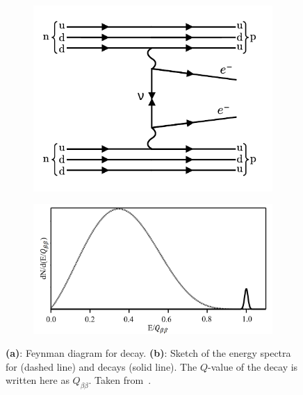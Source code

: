 \begin{figure}[!th]
    \centering
    \begin{subfigure}{0.40\textwidth}
        \centering
        \includegraphics[width=0.95\linewidth]{1_NeutrinoTheory/Figs/feynman_diag_ovbb.pdf}
        \caption{}
        \label{fig:feynman_diagram_ovbb}
    \end{subfigure}
    \begin{subfigure}{0.59\textwidth}
        \centering
        \includegraphics[width=\linewidth]{1_NeutrinoTheory/Figs/0vbb_2vbb_energy_spectrum_comparison.png}
        \caption{}
        \label{fig:energy_spectrum_bb}
    \end{subfigure}
    \caption[Feynaman diagram for \onbb{} decay, and sketch of the energy spectra for \twonbb{} and \onbb{}]
    {\textbf{(a)}: Feynman diagram for \onbb{} decay. \textbf{(b)}: Sketch of the energy spectra for \twonbb{} (dashed line) and \onbb{} decays (solid line). The $Q$-value of the decay is written here as $Q_{\beta\beta}$. Taken from~\cite{inacioDataAnalysisWater2022}.}
    \label{fig:ovbb_plots}
\end{figure}

